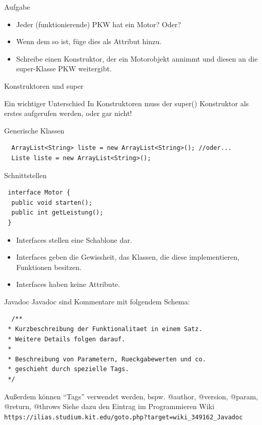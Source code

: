 \documentclass[18pt]{beamer}
\begin{document}
\begin{frame}{Aufgabe}
 \begin{itemize}
  \item Jeder (funktionierende) PKW hat ein Motor? Oder?
  \item Wenn dem so ist, füge dies als Attribut hinzu.
  \item Schreibe einen Konstruktor, der ein Motorobjekt annimmt und diesen an die super-Klasse PKW weitergibt.
 \end{itemize}
\end{frame}

\begin{frame}{Konstruktoren und super}
 \begin{alertblock}{Ein wichtiger Unterschied}
  In Konstruktoren muss der super() Konstruktor als erstes aufgerufen werden,
  oder gar nicht!
 \end{alertblock}
\end{frame}


\begin{frame}[fragile]{Generische Klassen}
 \begin{lstlisting}
  ArrayList<String> liste = new ArrayList<String>(); //oder...
  Liste liste = new ArrayList<String>();
 \end{lstlisting}
\end{frame}


\begin{frame}[fragile]{Schnittstellen}
\begin{lstlisting}
 interface Motor {
  public void starten();
  public int getLeistung();
 }
 \end{lstlisting}
 \begin{itemize}
  \item Interfaces stellen eine Schablone dar.
  \item Interfaces geben die Gewissheit, das Klassen, die diese implementieren, Funktionen besitzen.
  \item Interfaces haben keine Attribute.
 \end{itemize}

\end{frame}

\begin{frame}[fragile]{Javadoc}
 Javadoc sind Kommentare mit folgendem Schema:
 \begin{lstlisting}
  /**
 * Kurzbeschreibung der Funktionalitaet in einem Satz.
 * Weitere Details folgen darauf.
 * 
 * Beschreibung von Parametern, Rueckgabewerten und co.
 * geschieht durch spezielle Tags.
 */
 \end{lstlisting}
Außerdem können ``Tags'' verwendet werden, bspw. @author, @version, @param, @return, @throws
Siehe dazu den Eintrag im Programmieren Wiki
\scriptsize
\verb|https://ilias.studium.kit.edu/goto.php?target=wiki_349162_Javadoc|
\end{frame}
\end{document}
